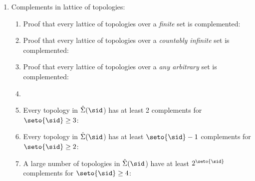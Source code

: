 {\begin{survey}
\begin{enumerate}
\item Complements in lattice of topologies:
  \begin{enumerate}
    \item Proof that every lattice of topologies over a \emph{finite} set is complemented:
          \\
    \item Proof that  every lattice of topologies over a \emph{countably infinite} set is complemented:
          \\
    \item Proof that  every lattice of topologies over a \emph{any arbitrary} set is complemented:
          \\
    \item {}
    \item Every topology in $\hat{\Sigma}(\sid$) has at least 2 complements for $\seto{\sid}\ge3$:
          \\
    \item Every topology in $\hat{\Sigma}(\sid$) has at least $\seto{\sid}-1$ complements for $\seto{\sid}\ge2$:
          \\
    \item A large number of topologies in $\hat{\Sigma}(\sid$) have at least $2^\seto{\sid}$ complements for $\seto{\sid}\ge4$:
          \\
  \end{enumerate}

\end{enumerate}
\end{survey}

} %



